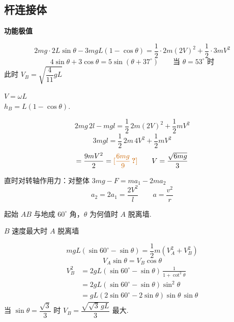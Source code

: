 \subsection{杆连接体}
\textbf{功能极值}

\begin{problem}[1、]
\begin{solution}
\[
2mg\cdot 2L\sin\theta-3mgL(1-\cos\theta)=\frac{1}{2}\cdot 2m(2V)^{2}+\frac{1}{2}\cdot 3mV^{2}
\]
\[
4\sin\theta+3\cos\theta=5\sin(\theta+37^\circ)\qquad \text{当 }\theta=53^\circ\text{ 时}
\]
此时 $V_B=\sqrt{\dfrac{4}{11}gL}$

\medskip
$V=\omega L$ %
\\
$h_B=L(1-\cos\theta)$.
\end{solution}
\end{problem}

\begin{problem}
\begin{solution}
\[ 2mg\,2l-mgl=\frac{1}{2}\,2m(2V)^2+\frac{1}{2}mV^2 \]
\[ 3mgl=\frac{1}{2}\,2m\,4V^2+\frac{1}{2}mV^2 \]
\[ =\frac{9mV^2}{2}=\text{\unclear{$\dfrac{6mg}{9}$}}\qquad V=\frac{\sqrt{6mg}}{3} \] %
\par\smallskip
{}直时对转轴作用力：对整体 $3mg-F=ma_1-2ma_2$
\[ a_2=2a_1=\frac{2V^2}{l} \qquad a=\frac{v^2}{r} \]
\end{solution}
\end{problem}

\begin{problem}[2、]
起始 $AB$ 与地成 $60^\circ$ 角，$\theta$ 为何值时 $A$ 脱离墙.

$B$ 速度最大时 $A$ 脱离墙
\begin{solution}
\[
mgL(\sin60^\circ-\sin\theta)=\frac{1}{2}m(V_A^{2}+V_B^{2})
\]
\[
V_A\sin\theta=V_B\cos\theta
\]
\begin{align*}
V_B^{2}&=2gL(\sin60^\circ-\sin\theta)\,\frac{1}{1+\cot^{2}\theta}\\
&=2gL(\sin60^\circ-\sin\theta)\sin^{2}\theta\\
&=gL(2\sin60^\circ-2\sin\theta)\sin\theta\,\sin\theta
\end{align*}
当 $\sin\theta=\dfrac{\sqrt{3}}{3}$ 时 $V_B=\dfrac{\sqrt{\sqrt{3}\,gL}}{3}$ 最大.
\end{solution}
\end{problem}

